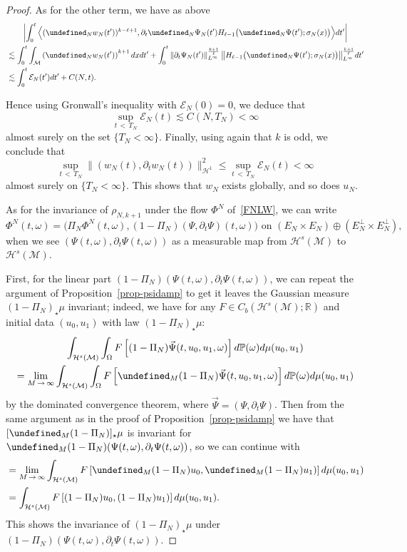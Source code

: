 \documentclass[AHL,Unicode,longabstracts,published]{cedram}
\newcommand{\R}{\mathbb{R}}
\newcommand{\Prob}{\mathbb{P}}
\let\P= \undefined
\newcommand{\P}{\mathbf{P}}
\newcommand{\En}{\mathcal{E}}
\newcommand{\M}{\mathcal{M}}
\renewcommand{\H}{\mathcal{H}}
\newcommand{\s}{\sigma}
\newcommand{\dt}{\partial_t}
\renewcommand{\o}{\omega}
\renewcommand{\O}{\Omega}
\newcommand{\les}{\lesssim}
\begin{document}
\begin{proof}
As for the other term, we have as above
\begin{multline*}
\left|\int_0^t\Big\langle (\P_Nw_N(t'))^{k-\ell+1},\dt\P_N\Psi_N(t') H_{\ell-1}\big(\P_N\Psi(t');\s_N(x)\big)\Big\rangle dt'\right|\\
\begin{aligned}
&\les \int_0^t\int_{\M}\left(\P_Nw_N(t')\right)^{k+1}dxdt' + \int_0^t\left\|\dt\Psi_N(t')\right\|_{L^\infty}^{\frac{k+1}\ell}\big\|H_{\ell-1}\big(\P_N\Psi(t');\s_N(x)\big)\big\|_{L^\infty}^{\frac{k+1}\ell}dt'\\
&\les \int_0^t\En_N(t')dt' + C(N,t).
\end{aligned}
\end{multline*}

Hence using Gronwall's inequality with $\En_N(0)=0$, we deduce that
\begin{equation*}
\sup_{t\,<\,T_N}\En_N(t) \les C(N,T_N) <\infty
\end{equation*}
almost surely on the set $\{T_N<\infty\}$. Finally, using again that $k$ is odd, we conclude that
\begin{equation*}
\sup_{t\,<\,T_N}\|(w_N(t),\dt w_N(t))\|_{\H^{1}}^2 \le \sup_{t\,<\,T_N}\En_N(t) <\infty
\end{equation*}
almost surely on $\{T_N<\infty\}$. This shows that $w_N$ exists globally, and so does $u_N$.


As for the invariance of $\rho_{N,k+1}$ under the flow $\Phi^N$ of~\eqref{FNLW}, we can write
\begin{equation*}
\Phi^N(t,\o) = \big(\Pi_N\Phi^N(t,\o), (1-\Pi_N)(\Psi,\dt\Psi)(t,\o)\big) \text{ on }\left(E_N\times E_N\right)\oplus \left(E_N^{\perp}\times E_N^{\perp}\right),
\end{equation*}
when we see $(\Psi(t,\o),\dt\Psi(t,\o))$ as a measurable map from $\H^s(\M)$ to $\H^s(\M)$.

First, for the linear part $(1-\Pi_N)(\Psi(t,\o),\dt\Psi(t,\o))$, we can repeat the argument of Proposition~\ref{prop-psidamp} to get it leaves the Gaussian measure $(1-\Pi_N)_\star\mu$ invariant; indeed, we have for any $F\in C_b(\H^s(\M);\R)$ and initial data $(u_0,u_1)$ with law $(1-\Pi_N)_\star\mu$:
\begin{multline*}
\int_{\H^s(\M)}\int_\O F\left[(1-\Pi_N)\vec\Psi(t,u_0,u_1,\o)\right]d\Prob(\o)d\mu(u_0,u_1)\\
=\lim_{M\,\to\,\infty}\int_{\H^s(\M)}\int_\O F\left[\P_M(1-\Pi_N)\vec\Psi(t,u_0,u_1,\o)\right]d\Prob(\o)d\mu(u_0,u_1)
\end{multline*}
by the dominated convergence theorem, where $\vec\Psi=(\Psi,\dt\Psi)$. Then from the same argument as in the proof of Proposition~\ref{prop-psidamp} we have that $[\P_M(1-\Pi_N)]_\star\mu$ is invariant for $\P_M(1-\Pi_N)(\Psi(t,\o),\dt\Psi(t,\o))$, so we can continue with
\begin{align*}
&=\lim_{M\,\to\,\infty}\int_{\H^s(\M)}F\left[\P_M(1-\Pi_N) u_0,\P_M(1-\Pi_N)u_1)\right]d\mu(u_0,u_1)\\
&=\int_{\H^s(\M)}F\left[(1-\Pi_N) u_0,(1-\Pi_N)u_1)\right]d\mu(u_0,u_1).
\end{align*}
This shows the invariance of $(1-\Pi_N)_\star\mu$ under $(1-\Pi_N)(\Psi(t,\o),\dt\Psi(t,\o))$.


\end{proof}
\end{document}
